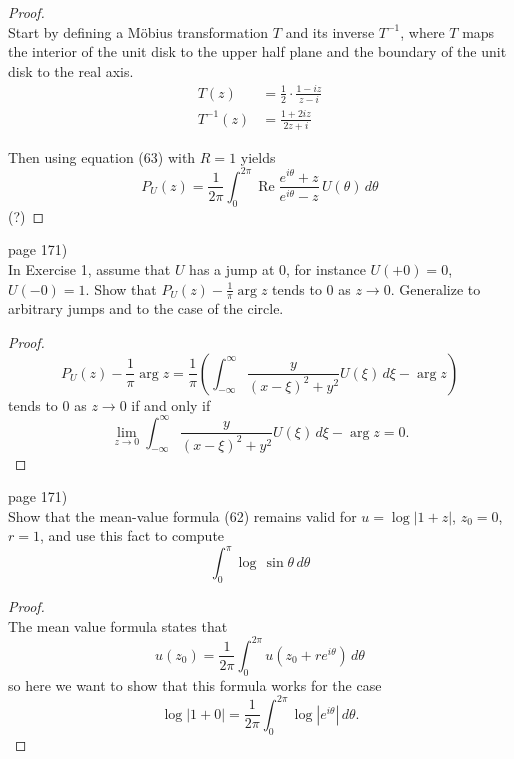 \documentclass{article}
\newenvironment{problem}[2][Problem]{\begin{trivlist}
\item[\hskip \labelsep {\bfseries #1}\hskip \labelsep {\bfseries #2.}]}{\end{trivlist}}
\begin{document}
\begin{proof} \text{} \\
  Start by defining a M\"obius transformation $T$ and its inverse $T^{-1}$,
  where $T$ maps the interior of the unit disk to the upper half plane and the
  boundary of the unit disk to the real axis. \begin{align*}
    T(z) &= \frac{1}{2} \cdot \frac{1 - iz}{z - i} \\
    T^{-1}(z) &= \frac{1 + 2iz}{2z + i}
  \end{align*}

  Then using equation (63) with $R = 1$ yields \[
  P_U(z) =
    \frac{1}{2\pi}\int_0^{2\pi}
      \operatorname{Re}\frac{e^{i\theta} + z}{e^{i\theta} - z}\,U(\theta)
    \,d\theta
  \]
  (?)
\end{proof}
\pagebreak

\begin{problem}{3} (page 171) \\
  In Exercise 1, assume that $U$ has a jump at $0$, for instance
  $U(+0) = 0$, $U(-0) = 1$. Show that $\displaystyle P_U(z)-\frac{1}{\pi}\arg z$
  tends to $0$ as $z \rightarrow 0$. Generalize to arbitrary jumps and to the
  case of the circle.
\end{problem}

\begin{proof} \text{} \\
  \[
    P_U(z) - \frac{1}{\pi}\arg z = \frac{1}{\pi}\left(
      \int_{-\infty}^\infty \frac{y}{(x - \xi)^2 + y^2}U(\xi)\,d\xi
      - \arg z
    \right)
  \] tends to $0$ as $z \rightarrow 0$ if and only if \[
    \lim_{z \rightarrow 0}
    \int_{-\infty}^\infty \frac{y}{(x - \xi)^2 + y^2}U(\xi)\,d\xi - \arg z
    = 0.
  \]
\end{proof}
\pagebreak

\begin{problem}{5} (page 171) \\
  Show that the mean-value formula (62) remains valid for
  $u=\log|1 + z|$,
  $z_0 = 0$,
  $r = 1$, and use this fact to compute \[
    \int_0^\pi \log\, \sin \theta\, d\theta
  \]
\end{problem}

\begin{proof} \text{} \\
  The mean value formula states that \[
    u(z_0) = \frac{1}{2\pi}\int_0^{2\pi} u(z_0 + re^{i\theta})\,d\theta
  \] so here we want to show that this formula works for the case \[
    \log|1 + 0| = \frac{1}{2\pi}\int_0^{2\pi} \log|e^{i\theta}|\,d\theta.
  \]
\end{proof}
\end{document}
